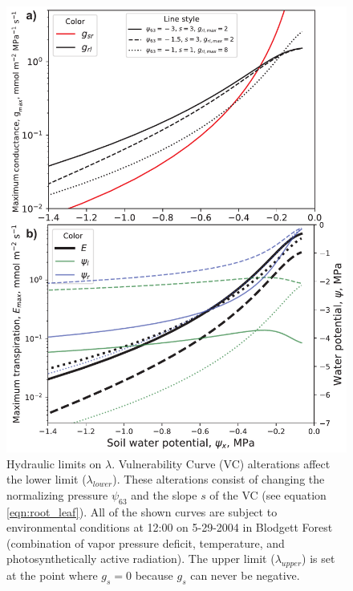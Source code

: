 \documentclass[utf8]{frontiersSCNS} %
\begin{document}
\begin{figure}[h]
    \begin{center}
        \includegraphics[scale=0.75]{g_E_psix.pdf}
    \end{center}
    \caption{Hydraulic limits on $\lambda$. Vulnerability Curve (VC) alterations affect the lower limit ($\lambda_{lower}$). These alterations consist of changing the normalizing pressure $\psi_{63}$ and the slope $s$ of the VC (see equation \ref{eqn:root_leaf}). All of the shown curves are subject to environmental conditions at 12:00 on 5-29-2004 in Blodgett Forest (combination of vapor pressure deficit, temperature, and photosynthetically active radiation). The upper limit ($\lambda_{upper}$) is set at the point where $g_s=0$ because $g_s$ can never be negative.}
    \label{fig:gmax_Emax_psix}
\end{figure}
\end{document}
